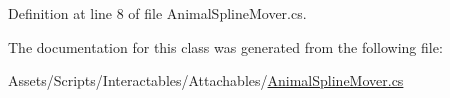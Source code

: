 Definition at line 8 of file Animal\+Spline\+Mover.\+cs.



The documentation for this class was generated from the following file\+:\begin{DoxyCompactItemize}
\item 
Assets/\+Scripts/\+Interactables/\+Attachables/\mbox{\hyperlink{_animal_spline_mover_8cs}{Animal\+Spline\+Mover.\+cs}}\end{DoxyCompactItemize}
